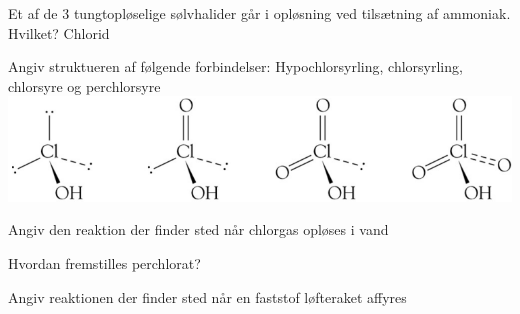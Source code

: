 \begin{flashcard}[Reaktion]{Et af de 3 tungtopløselige sølvhalider går i opløsning ved tilsætning af ammoniak. Hvilket?}
Chlorid\\ \vspace{7pt}
\end{flashcard}

\begin{flashcard}[Struktur]{Angiv struktueren af følgende forbindelser: Hypochlorsyrling, chlorsyrling, chlorsyre og perchlorsyre}
\includegraphics[width=\textwidth]{figures/k17s471Cl.png}
\end{flashcard}

\begin{flashcard}[Reaktion]{Angiv den reaktion der finder sted når chlorgas opløses i vand}
\end{flashcard}

\begin{flashcard}[Fremstilling]{Hvordan fremstilles perchlorat?}
\\ \vspace{7pt}
\end{flashcard}

\begin{flashcard}[Anvendelse]{Angiv reaktionen der finder sted når en faststof løfteraket affyres}
\end{flashcard}
